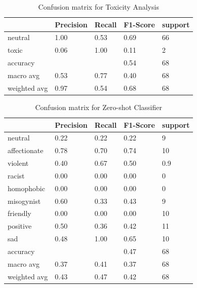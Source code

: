 \begin{table}[!htb]
    \centering
    \begin{tabular}{l|llll}
     & Precision & Recall & F1-Score & support \\ \hline \hline
    neutral & 1.00 & 0.53 & 0.69 & 66\\
    toxic & 0.06 & 1.00 & 0.11 & 2 \\ \hline
    accuracy & & & 0.54 & 68\\
    macro avg & 0.53 & 0.77 & 0.40 & 68 \\
    weighted avg & 0.97 & 0.54 & 0.68 & 68\\
    \end{tabular}
    \caption{Confusion matrix for Toxicity Analysis}
    \label{tab:confusion_matrix_toxicity}
\end{table}

\begin{table}[!htb]
\centering
\begin{tabular}{l|llll}
 & Precision & Recall & F1-Score & support \\ \hline \hline
neutral & 0.22 & 0.22 & 0.22 & 9\\
affectionate & 0.78 & 0.70 & 0.74 & 10 \\ 
violent & 0.40 & 0.67 & 0.50 & 0.9\\
racist & 0.00 & 0.00 & 0.00 & 0\\
homophobic & 0.00 & 0.00 & 0.00 & 0\\
misogynist & 0.60 & 0.33 & 0.43 & 9\\
friendly & 0.00 & 0.00 & 0.00 & 10\\
positive & 0.50 & 0.36 & 0.42 & 11\\
sad & 0.48 & 1.00 & 0.65 & 10\\ \hline
accuracy & & & 0.47 & 68\\
macro avg & 0.37 & 0.41 & 0.37 & 68 \\
weighted avg & 0.43 & 0.47 & 0.42 & 68\\
\end{tabular}
\caption{Confusion matrix for Zero-shot Classifier}
\label{tab:confusion_matrix_zero_shot}
\end{table}







